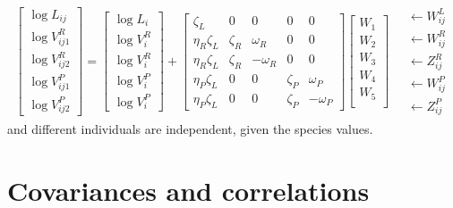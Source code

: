 \documentclass{article}
\begin{document}
\begin{align} \label{eqn:sample_matrix}
\begin{bmatrix}
    \log L_{ij} \\
    \log V_{ij1}^R \\ \log V_{ij2}^R  \\
    \log V_{ij1}^P \\ \log V_{ij2}^P  
\end{bmatrix}
=
\begin{bmatrix}
    \log L_{i} \\
    \log V_{i}^R \\ \log V_{i}^R  \\
    \log V_{i}^P \\ \log V_{i}^P  
\end{bmatrix}
+
\begin{bmatrix}
    \zeta_L  &   0 & 0  & 0  & 0 \\
    \eta_R \zeta_L  &  \zeta_R  &  \omega_R  & 0 & 0 \\ 
    \eta_R \zeta_L  & \zeta_R   & - \omega_R & 0 & 0\\ 
    \eta_P \zeta_L  & 0 & 0 &  \zeta_P  & \omega_P  \\ 
    \eta_P \zeta_L  & 0 & 0 &  \zeta_P  & - \omega_P
\end{bmatrix}
\begin{bmatrix}
W_1 \\W_2 \\W_3 \\W_4 \\ W_5  \\ 
\end{bmatrix}
\quad \begin{matrix}
    \leftarrow W^L_{ij}  \\
    \leftarrow W^R_{ij}  \\
    \leftarrow Z^R_{ij}  \\
    \leftarrow W^P_{ij} \\ 
    \leftarrow Z^P_{ij} 
\end{matrix}
\end{align}
and different individuals are independent, given the species values.


\section{Covariances and correlations}
\end{document}

